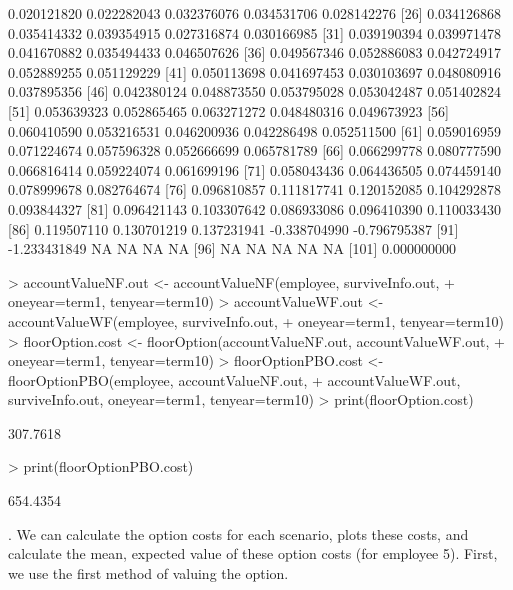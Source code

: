 \documentclass[12pt]{article}
\begin{document}
\begin{Schunk}
\begin{Soutput}
 [21]  0.020121820  0.022282043  0.032376076  0.034531706  0.028142276
 [26]  0.034126868  0.035414332  0.039354915  0.027316874  0.030166985
 [31]  0.039190394  0.039971478  0.041670882  0.035494433  0.046507626
 [36]  0.049567346  0.052886083  0.042724917  0.052889255  0.051129229
 [41]  0.050113698  0.041697453  0.030103697  0.048080916  0.037895356
 [46]  0.042380124  0.048873550  0.053795028  0.053042487  0.051402824
 [51]  0.053639323  0.052865465  0.063271272  0.048480316  0.049673923
 [56]  0.060410590  0.053216531  0.046200936  0.042286498  0.052511500
 [61]  0.059016959  0.071224674  0.057596328  0.052666699  0.065781789
 [66]  0.066299778  0.080777590  0.066816414  0.059224074  0.061699196
 [71]  0.058043436  0.064436505  0.074459140  0.078999678  0.082764674
 [76]  0.096810857  0.111817741  0.120152085  0.104292878  0.093844327
 [81]  0.096421143  0.103307642  0.086933086  0.096410390  0.110033430
 [86]  0.119507110  0.130701219  0.137231941 -0.338704990 -0.796795387
 [91] -1.233431849           NA           NA           NA           NA
 [96]           NA           NA           NA           NA           NA
[101]  0.000000000
\end{Soutput}
\begin{Sinput}
> accountValueNF.out <- accountValueNF(employee, surviveInfo.out, 
+   oneyear=term1, tenyear=term10)
> accountValueWF.out <- accountValueWF(employee, surviveInfo.out,
+   oneyear=term1, tenyear=term10)
> floorOption.cost <- floorOption(accountValueNF.out, accountValueWF.out,
+   oneyear=term1, tenyear=term10)
> floorOptionPBO.cost <- floorOptionPBO(employee, accountValueNF.out,
+   accountValueWF.out, surviveInfo.out, oneyear=term1, tenyear=term10)
> print(floorOption.cost)
\end{Sinput}
\begin{Soutput}
[1] 307.7618
\end{Soutput}
\begin{Sinput}
> print(floorOptionPBO.cost)
\end{Sinput}
\begin{Soutput}
[1] 654.4354
\end{Soutput}
\end{Schunk}
.
We can calculate the option costs for each scenario, plots these costs, and calculate
the mean, expected value of these option costs 
(for employee 5). First, we use the first method of valuing the option.
\end{document}
